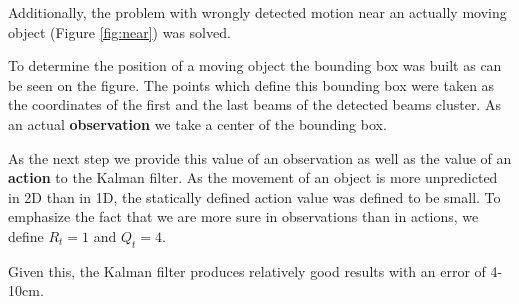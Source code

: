 \documentclass{article}
\begin{document}
Additionally, the problem with wrongly detected motion near an
actually moving object (Figure \ref{fig:near}) was solved.

To determine the position of a moving object the bounding box was built
as can be seen on the figure. The points which define this bounding box
were taken as the coordinates of the first and the last beams of the
detected beams cluster. As an actual \textbf{observation} we take a
center of the bounding box.

As the next step we provide this value of an observation as well as the
value of an \textbf{action} to the Kalman filter. As the movement of an object is
more unpredicted in 2D than in 1D, the statically defined action value
was defined to be small. To emphasize the fact that we are more sure in
observations than in actions, we define $R_t=1$ and $Q_t=4$.

Given this, the Kalman filter produces relatively good results with an
error of 4-10cm.
\end{document}
